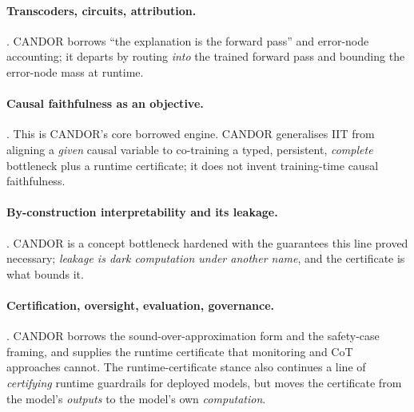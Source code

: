 \documentclass[11pt]{article}
\begin{document}
\paragraph{Transcoders, circuits, attribution.}
\citep{dunefsky2024transcoders,marks2024sparse,ameisen2025circuit,lindsey2025biology,
wang2022ioi,conmy2023acdc,syed2023eap,miller2024faithfulnessnotrobust}. CANDOR borrows
``the explanation is the forward pass'' and error-node accounting; it departs by routing
\emph{into} the trained forward pass and bounding the error-node mass at runtime.

\paragraph{Causal faithfulness as an objective.}
\citep{geiger2021causalabstractions,geiger2022iit,geiger2024das,wu2023boundlessdas,
chan2022causalscrubbing,geiger2025causalabstraction,makelov2023illusion}. This is
CANDOR's core borrowed engine. CANDOR generalises IIT from aligning a \emph{given}
causal variable to co-training a typed, persistent, \emph{complete} bottleneck plus a
runtime certificate; it does not invent training-time causal faithfulness.

\paragraph{By-construction interpretability and its leakage.}
\citep{koh2020concept,alvarezmelis2018senn,espinosa2022concept,chen2019thislooks,
bohle2022bcos,oord2017vqvae,hewitt2023backpack,rudin2019stop,mahinpei2021promises,
havasi2022addressing,locatello2019challenging}. CANDOR is a concept bottleneck hardened
with the guarantees this line proved necessary; \emph{leakage is dark computation under
another name}, and the certificate is what bounds it.

\paragraph{Certification, oversight, evaluation, governance.}
\citep{katz2017reluplex,zhang2018crown,xu2020autolirpa,przybysz2023verifying,
ignatiev2019abduction,christiano2021elk,roger2023measurement,lanham2023measuring,
chen2025reasoning,baker2025monitoring,korbak2025cot,jacovi2020faithfully,
karvonen2025saebench,amodei2025urgency,clymer2024safetycases,euaiact2024}. CANDOR
borrows the sound-over-approximation form and the safety-case framing, and supplies the
runtime certificate that monitoring and CoT approaches cannot. The runtime-certificate
stance also continues a line of \emph{certifying} runtime guardrails for deployed
models, but moves the certificate from the model's \emph{outputs} to the model's own
\emph{computation}.
\end{document}
